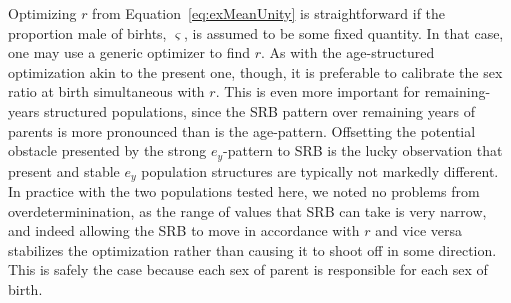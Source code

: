 
Optimizing $r$ from Equation~\eqref{eq:exMeanUnity} is straightforward if the
proportion male of birhts, $\varsigma$, is assumed to be some fixed quantity.
In that case, one may use a generic optimizer to find $r$. As with the
age-structured optimization akin to the present one, though, it is preferable to
calibrate the sex ratio at birth simultaneous with $r$. This is even more
important for remaining-years structured populations, since the SRB pattern over
remaining years of parents is more pronounced than is the age-pattern.
Offsetting the potential obstacle presented by the strong $e_y$-pattern to SRB
is the lucky observation that present and stable $e_y$ population structures are
typically not markedly different. In practice with the two populations tested
here, we noted no problems from overdeterminination, as the range of values that
SRB can take is very narrow, and indeed allowing the SRB to move in accordance
with $r$ and vice versa stabilizes the optimization rather than causing it to
shoot off in some direction. This is safely the case because each sex of parent
is responsible for each sex of birth.

